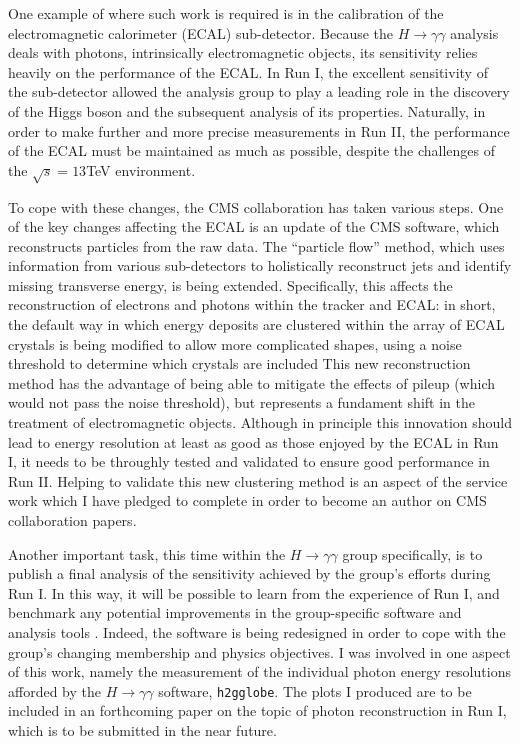 \documentclass[10pt]{article}
\begin{document}
One example of where such work is required is in the calibration of the electromagnetic calorimeter (ECAL) sub-detector. Because the $H \rightarrow \gamma \gamma$ analysis deals with photons, intrinsically electromagnetic objects, its sensitivity relies heavily on the performance of the ECAL. In Run I, the excellent sensitivity of the sub-detector allowed the analysis group to play a  leading role in the discovery of the Higgs boson and the subsequent analysis of its properties. Naturally, in order to make further and more precise measurements in Run II, the performance of the ECAL must be maintained as much as possible, despite the challenges of the $\sqrt{s} = 13$TeV environment.

To cope with these changes, the CMS collaboration has taken various steps. One of the key changes affecting the ECAL is an update of the CMS software, which reconstructs particles from the raw data. The ``particle flow'' method, which uses information from various sub-detectors to holistically reconstruct jets and identify missing transverse energy, is being extended. Specifically, this affects the reconstruction of electrons and photons within the tracker and ECAL: in short, the default way in which energy deposits are clustered within the array of ECAL crystals is being modified to allow more complicated shapes, using a noise threshold to determine which crystals are included This new reconstruction method has the advantage of being able to mitigate the effects of pileup (which would not pass the noise threshold), but represents a fundament shift in the treatment of electromagnetic objects. Although in principle this innovation should lead to energy resolution at least as good as those enjoyed by the ECAL in Run I, it needs to be throughly tested and validated to ensure good performance in Run II. Helping to validate this new clustering method is an aspect of the service work which I have pledged to complete in order to become an author on CMS collaboration papers.

Another important task, this time within the $H \rightarrow \gamma \gamma$ group specifically, is to publish a final analysis of the sensitivity achieved by the group's efforts during Run I. In this way, it will be possible to learn from the experience of Run I, and benchmark any potential improvements in the group-specific software and analysis tools . Indeed, the software is being redesigned in order to cope with the group's changing membership and physics objectives. I was involved in one aspect of this work, namely the measurement of the individual photon energy resolutions afforded by the $H \rightarrow \gamma \gamma$ software, \texttt{h2gglobe}. The plots I produced are to be included in an forthcoming paper on the topic of photon reconstruction in Run I, which is to be submitted in the near future. %
\end{document}
